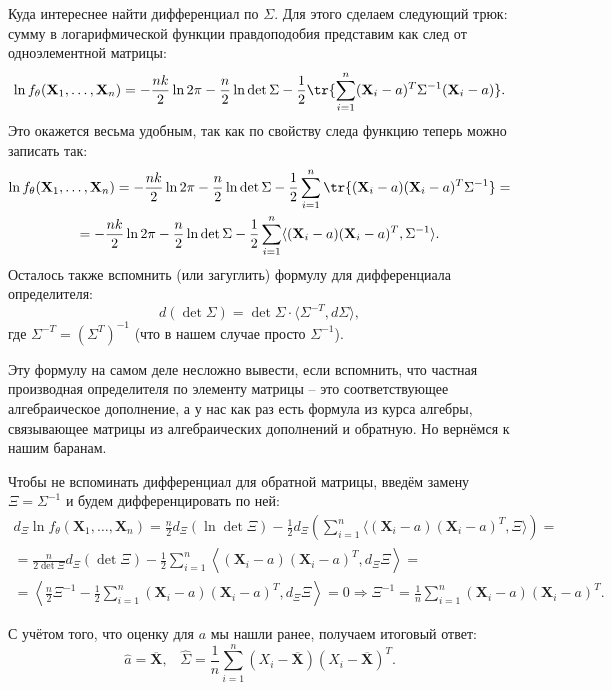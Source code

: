 \begin{example}
Куда интереснее найти дифференциал по $\Sigma$. Для этого сделаем следующий трюк: сумму в логарифмической функции правдоподобия представим как след от одноэлементной матрицы:
\[
\ln{f_{\theta}(\mathbf X_1, \ldots, \mathbf X_n)} = -\frac{nk}{2}\ln{2\pi} - \frac{n}{2}\ln{\det{\Sigma}} - \frac{1}{2}\tr{\sum_{i=1}^n (\mathbf X_i-a)^T\Sigma^{-1}(\mathbf X_i-a)}.
\]
Это окажется весьма удобным, так как по свойству следа функцию теперь можно записать так:
\begin{gather*}
\ln{f_{\theta}(\mathbf X_1, \ldots, \mathbf X_n)} = -\frac{nk}{2}\ln{2\pi} - \frac{n}{2}\ln{\det{\Sigma}} - \frac{1}{2}\sum_{i=1}^n \tr{(\mathbf X_i-a)(\mathbf X_i-a)^T\Sigma^{-1}} = \\
= -\frac{nk}{2}\ln{2\pi} - \frac{n}{2}\ln{\det{\Sigma}} - \frac{1}{2}\sum_{i=1}^n \langle (\mathbf X_i-a)(\mathbf X_i-a)^T, \Sigma^{-1}\rangle.
\end{gather*}
Осталось также вспомнить (или загуглить) формулу для дифференциала определителя:
\[
d (\det{\Sigma}) = \det{\Sigma} \cdot \langle\Sigma^{-T}, d \Sigma\rangle,
\]
где $\Sigma^{-T} = (\Sigma^T)^{-1}$ (что в нашем случае просто $\Sigma^{-1}$). 

{\footnotesize Эту формулу на самом деле несложно вывести, если вспомнить, что частная производная определителя по элементу матрицы -- это соответствующее алгебраическое дополнение, а у нас как раз есть формула из курса алгебры, связывающее матрицы из алгебраических дополнений и обратную. Но вернёмся к нашим баранам.}

Чтобы не вспоминать дифференциал для обратной матрицы, введём замену $\Xi = \Sigma^{-1}$ и будем дифференцировать по ней:
\begin{gather*}
    d_{\Xi} \ln{f_{\theta}(\mathbf X_1, \ldots, \mathbf X_n)} = \frac{n}{2}d_{\Xi} (\ln{\det{\Xi}}) - \frac{1}{2} d_{\Xi} \left( \sum_{i=1}^n \langle (\mathbf X_i-a)(\mathbf X_i-a)^T, \Xi\rangle\right) =\\
    = \frac{n}{2\det{\Xi}} d_{\Xi}(\det{\Xi}) - \frac{1}{2} \sum_{i=1}^n \left< (\mathbf X_i-a)(\mathbf X_i-a)^T, d_{\Xi} \Xi\right> = \\
    = \left< \frac{n}{2}\Xi^{-1} - \frac{1}{2} \sum_{i=1}^n (\mathbf X_i-a)(\mathbf X_i-a)^T, d_{\Xi} \Xi\right> = 0 \Longrightarrow \Xi^{-1} = \frac{1}{n}\sum_{i=1}^n (\mathbf X_i-a)(\mathbf X_i-a)^T.
\end{gather*}

С учётом того, что оценку для $a$ мы нашли ранее, получаем итоговый ответ:
\[
\widehat{a} = \overline{\mathbf X},\;\;\;\widehat{\Sigma} = \frac{1}{n}\sum_{i=1}^n (X_i-\overline{\mathbf X})(X_i-\overline{\mathbf X})^T.
\]

\end{example}

